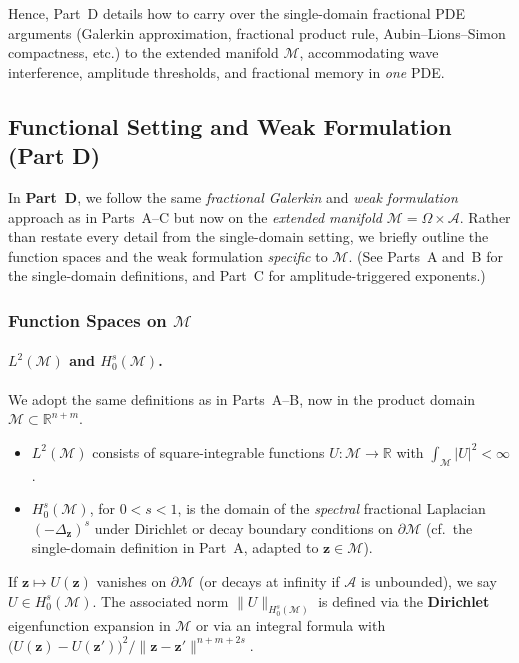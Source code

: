 \documentclass[12pt]{article}
\begin{document}
Hence, Part~D details how to carry over the single-domain fractional PDE arguments 
(Galerkin approximation, fractional product rule, Aubin--Lions--Simon compactness, 
etc.) to the extended manifold $\mathcal{M}$, accommodating wave interference, 
amplitude thresholds, and fractional memory in \emph{one} PDE.
\subsection{Functional Setting and Weak Formulation (Part D)}
\label{sec:functional-setting_D}

In \textbf{Part~D}, we follow the same \emph{fractional Galerkin} and \emph{weak formulation} approach 
as in Parts~A--C but now on the \emph{extended manifold} 
\(\mathcal{M}=\Omega\times \mathcal{A}\). 
Rather than restate every detail from the single-domain setting, we briefly outline the 
function spaces and the weak formulation \emph{specific} to \(\mathcal{M}\). 
(See Parts~A and~B for the single-domain definitions, and Part~C for amplitude-triggered 
exponents.)

\subsubsection{Function Spaces on \texorpdfstring{\(\mathcal{M}\)}{}}
\label{subsubsec:function-spaces_M}

\paragraph{\texorpdfstring{$L^2(\mathcal{M})$}{L2(M)} and \texorpdfstring{$H_0^s(\mathcal{M})$}{H0s(M)}.}
We adopt the same definitions as in Parts~A--B, now in the product domain 
\(\mathcal{M}\subset \mathbb{R}^{n+m}\). 
\begin{itemize}
  \item \(\displaystyle L^2(\mathcal{M})\) consists of square-integrable functions 
        $U:\mathcal{M}\to\mathbb{R}$ with $\int_{\mathcal{M}} |U|^2<\infty$.  
  \item \(\displaystyle H_0^s(\mathcal{M})\), for $0<s<1$, is the domain of the \emph{spectral} 
        fractional Laplacian $(-\Delta_{\mathbf{z}})^s$ under Dirichlet or decay boundary 
        conditions on $\partial \mathcal{M}$ (cf.\ the single-domain definition in 
        Part~A, adapted to $\mathbf{z}\in\mathcal{M}$).  
\end{itemize}
If $\mathbf{z}\mapsto U(\mathbf{z})$ vanishes on $\partial\mathcal{M}$ (or decays at infinity 
if $\mathcal{A}$ is unbounded), we say $U\in H_0^s(\mathcal{M})$. 
The associated norm \(\|U\|_{H_0^s(\mathcal{M})}\) is defined via the \textbf{Dirichlet} 
eigenfunction expansion in $\mathcal{M}$ or via an integral formula with 
\(\bigl(U(\mathbf{z})-U(\mathbf{z}')\bigr)^2/\|\mathbf{z}-\mathbf{z}'\|^{n+m+2s}\). 
\end{document}
